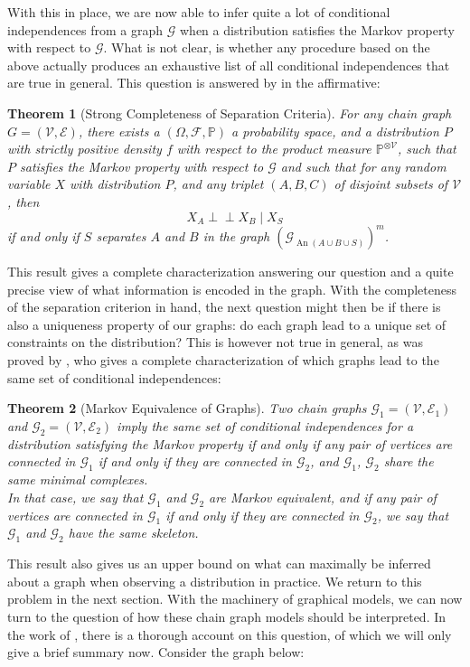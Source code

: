 \documentclass[11pt, a4paper]{memoir}
\theoremstyle{break}
\newtheorem{thm}{Theorem}
\theoremstyle{break}
\theoremstyle{nonumberplain}
\newcommand{\mP}{\mathbb{P}}
\newcommand{\indep}{\perp \!\!\! \perp}
\DeclareMathOperator{\an}{An}
\begin{document}
With this in place, we are now able to infer quite a lot of conditional independences from a graph $\mathcal{G}$ when a distribution satisfies the Markov property with respect to $\mathcal{G}$. What is not clear, is whether any procedure based on the above actually produces an exhaustive list of all conditional independences that are true in general. This question is answered by \cite{Remco} in the affirmative:
\begin{thm}[Strong Completeness of Separation Criteria]\label{separate}
For any chain graph $G=(\mathcal{V},\mathcal{E})$, there exists a $(\Omega, \mathcal{F}, \mP)$ a probability space, and a distribution $P$ with strictly positive density $f$ with respect to the product measure $\mP^{\otimes \mathcal{V}}$, such that $P$ satisfies the Markov property with respect to $\mathcal{G}$ and such that for any random variable $X$ with distribution $P$, and any triplet $(A,B,C)$ of disjoint subsets of $\mathcal{V}$, then
$$X_A\indep X_B\mid X_S$$
if and only if $S$ separates $A$ and $B$ in the graph $\left(\mathcal{G}_{\an(A\cup B\cup S)}\right)^m$.
\end{thm}
This result gives a complete characterization answering our question and a quite precise view of what information is encoded in the graph. With the completeness of the separation criterion in hand, the next question might then be if there is also a uniqueness property of our graphs: do each graph lead to a unique set of constraints on the distribution? This is however not true in general, as was proved by \cite{Frydenberg}, who gives a complete characterization of which graphs lead to the same set of conditional independences:
\begin{thm}[Markov Equivalence of Graphs]
Two chain graphs $\mathcal{G}_1=(\mathcal{V},\mathcal{E}_1)$ and $\mathcal{G}_2=(\mathcal{V},\mathcal{E}_2)$  imply the same set of conditional independences for a distribution satisfying the Markov property if and only if any pair of vertices are connected in $\mathcal{G}_1$ if and only if they are connected in $\mathcal{G}_2$, and $\mathcal{G}_1$, $\mathcal{G}_2$ share the same minimal complexes.\\
In that case, we say that $\mathcal{G}_1$ and $\mathcal{G}_2$ are \emph{Markov equivalent}, and if any pair of vertices are connected in $\mathcal{G}_1$ if and only if they are connected in $\mathcal{G}_2$, we say that $\mathcal{G}_1$ and $\mathcal{G}_2$ have the same \emph{skeleton}.
\end{thm}
This result also gives us an upper bound on what can maximally be inferred about a graph when observing a distribution in practice. We return to this problem in the next section. With the machinery of graphical models, we can now turn to the question of how these chain graph models should be interpreted. In the work of \cite{ChainGraph}, there is a thorough account on this question, of which we will only give a brief summary now. Consider the graph below:
\end{document}
